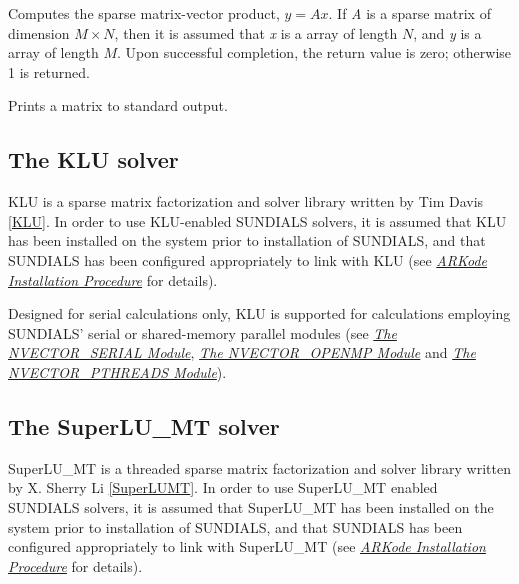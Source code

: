 \documentclass[letterpaper,10pt,english]{sphinxmanual}
\begin{document}
\begin{fulllineitems}
\label{linear_solvers/SLS:SlsMatvec}
Computes the sparse matrix-vector product, $y=Ax$.  If \emph{A}
is a sparse matrix of dimension $M\times N$, then it is assumed that \emph{x}
is a  array of  length $N$, and \emph{y} is a
 array of length $M$. Upon successful completion, the
return value is zero; otherwise 1 is returned.

\end{fulllineitems}


\begin{fulllineitems}
\label{linear_solvers/SLS:PrintSparseMat}
Prints a {\hyperref[linear_solvers/SLS:SlsMat]{}} matrix to standard output.

\end{fulllineitems}



\subsection{The KLU solver}
\label{linear_solvers/SLS:the-klu-solver}
KLU is a sparse matrix factorization and solver library written by Tim
Davis {\hyperref[References:klu]{{[}KLU{]}}}.  In order to use KLU-enabled SUNDIALS solvers, it is
assumed that KLU has been installed on the system prior to
installation of SUNDIALS, and that SUNDIALS has been configured
appropriately to link with KLU (see {\hyperref[Install:installation]{\emph{ARKode Installation Procedure}}} for details).

Designed for serial calculations only, KLU is supported for
calculations employing SUNDIALS' serial or shared-memory parallel
 modules (see {\hyperref[nvectors/NVector_Serial:nvectors-nvserial]{\emph{The NVECTOR\_SERIAL Module}}},
{\hyperref[nvectors/NVector_OpenMP:nvectors-openmp]{\emph{The NVECTOR\_OPENMP Module}}} and {\hyperref[nvectors/NVector_Pthreads:nvectors-pthreads]{\emph{The NVECTOR\_PTHREADS Module}}}).


\subsection{The SuperLU\_MT solver}
\label{linear_solvers/SLS:the-superlu-mt-solver}
SuperLU\_MT is a threaded sparse matrix factorization and solver
library written by X. Sherry Li {\hyperref[References:superlumt]{{[}SuperLUMT{]}}}.  In order to use
SuperLU\_MT enabled SUNDIALS solvers, it is assumed that SuperLU\_MT has
been installed on the system prior to installation of SUNDIALS, and
that SUNDIALS has been configured appropriately to link with
SuperLU\_MT (see {\hyperref[Install:installation]{\emph{ARKode Installation Procedure}}} for details).
\end{document}

